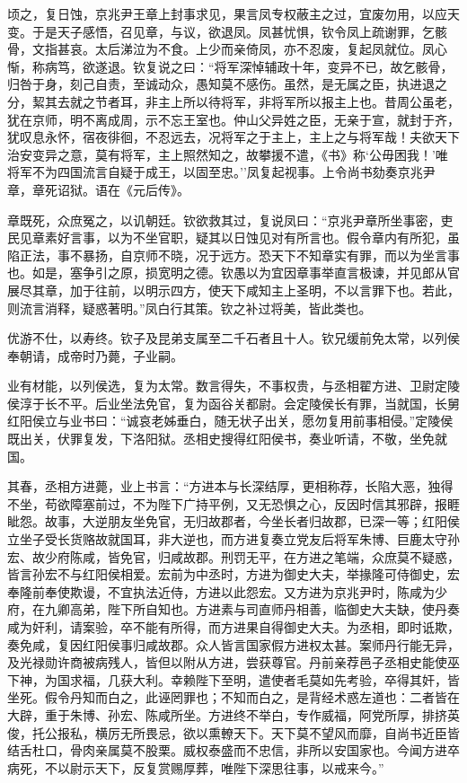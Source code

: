 \documentclass[]{article}
\begin{document}
顷之，复日蚀，京兆尹王章上封事求见，果言凤专权蔽主之过，宜废勿用，以应天变。于是天子感悟，召见章，与议，欲退凤。凤甚忧惧，钦令凤上疏谢罪，乞骸骨，文指甚哀。太后涕泣为不食。上少而亲倚凤，亦不忍废，复起凤就位。凤心惭，称病笃，欲遂退。钦复说之曰：``将军深悼辅政十年，变异不已，故乞骸骨，归咎于身，刻己自责，至诚动众，愚知莫不感伤。虽然，是无属之臣，执进退之分，絜其去就之节者耳，非主上所以待将军，非将军所以报主上也。昔周公虽老，犹在京师，明不离成周，示不忘王室也。仲山父异姓之臣，无亲于宣，就封于齐，犹叹息永怀，宿夜徘徊，不忍远去，况将军之于主上，主上之与将军哉！夫欲天下治安变异之意，莫有将军，主上照然知之，故攀援不遣，《书》称`公毋困我！'唯将军不为四国流言自疑于成王，以固至忠。''凤复起视事。上令尚书劾奏京兆尹章，章死诏狱。语在《元后传》。

章既死，众庶冤之，以讥朝廷。钦欲救其过，复说凤曰：``京兆尹章所坐事密，吏民见章素好言事，以为不坐官职，疑其以日蚀见对有所言也。假令章内有所犯，虽陷正法，事不暴扬，自京师不晓，况于远方。恐天下不知章实有罪，而以为坐言事也。如是，塞争引之原，损宽明之德。钦愚以为宜因章事举直言极谏，并见郎从官展尽其章，加于往前，以明示四方，使天下咸知主上圣明，不以言罪下也。若此，则流言消释，疑惑著明。''凤白行其策。钦之补过将美，皆此类也。

优游不仕，以寿终。钦子及昆弟支属至二千石者且十人。钦兄缓前免太常，以列侯奉朝请，成帝时乃薨，子业嗣。

业有材能，以列侯选，复为太常。数言得失，不事权贵，与丞相翟方进、卫尉定陵侯淳于长不平。后业坐法免官，复为函谷关都尉。会定陵侯长有罪，当就国，长舅红阳侯立与业书曰：``诚哀老姊垂白，随无状子出关，愿勿复用前事相侵。''定陵侯既出关，伏罪复发，下洛阳狱。丞相史搜得红阳侯书，奏业听请，不敬，坐免就国。

其春，丞相方进薨，业上书言：``方进本与长深结厚，更相称荐，长陷大恶，独得不坐，苟欲障塞前过，不为陛下广持平例，又无恐惧之心，反因时信其邪辟，报睚眦怨。故事，大逆朋友坐免官，无归故郡者，今坐长者归故郡，已深一等；红阳侯立坐子受长货赂故就国耳，非大逆也，而方进复奏立党友后将军朱博、巨鹿太守孙宏、故少府陈咸，皆免官，归咸故郡。刑罚无平，在方进之笔端，众庶莫不疑惑，皆言孙宏不与红阳侯相爱。宏前为中丞时，方进为御史大夫，举掾隆可侍御史，宏奉隆前奉使欺谩，不宜执法近侍，方进以此怨宏。又方进为京兆尹时，陈咸为少府，在九卿高弟，陛下所自知也。方进素与司直师丹相善，临御史大夫缺，使丹奏咸为奸利，请案验，卒不能有所得，而方进果自得御史大夫。为丞相，即时诋欺，奏免咸，复因红阳侯事归咸故郡。众人皆言国家假方进权太甚。案师丹行能无异，及光禄勋许商被病残人，皆但以附从方进，尝获尊官。丹前亲荐邑子丞相史能使巫下神，为国求福，几获大利。幸赖陛下至明，遣使者毛莫如先考验，卒得其奸，皆坐死。假令丹知而白之，此诬罔罪也；不知而白之，是背经术惑左道也：二者皆在大辟，重于朱博、孙宏、陈咸所坐。方进终不举白，专作威福，阿党所厚，排挤英俊，托公报私，横厉无所畏忌，欲以熏轑天下。天下莫不望风而靡，自尚书近臣皆结舌杜口，骨肉亲属莫不股栗。威权泰盛而不忠信，非所以安国家也。今闻方进卒病死，不以尉示天下，反复赏赐厚葬，唯陛下深思往事，以戒来今。''
\end{document}
